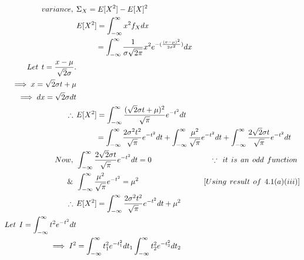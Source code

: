 \documentclass[a4paper,fleqn,11pt]{article}
\theoremstyle{mytheor}
\begin{document}
\begin{align*}
variance, \hspace{1ex} & \Sigma_{X} = E[X^2] - E[X]^2 \\
& E[X^2] = \int_{-\infty}^{\infty} x^2 f_{X} dx \\
& \hspace{6ex} = \int_{-\infty}^{\infty} \frac{1}{\sigma\sqrt{2\pi}} x^2 e^{-(\frac{(x - \mu)^2}{2\sigma^2})} dx \\
Let \hspace{1ex} t = \frac{x - \mu}{\sqrt{2} \sigma}. \\
\implies x = \sqrt{2} \sigma t + \mu \\
\implies dx = \sqrt{2} \sigma dt \\
\therefore \hspace{1ex} & E[X^2] = \int_{-\infty}^{\infty} \frac{(\sqrt{2}\sigma t + \mu)^2}{\sqrt{\pi}} e^{-t^2} dt \\
& \hspace{6ex} = \int_{-\infty}^{\infty} \frac{2\sigma^2 t^2}{\sqrt{\pi}} e^{-t^2} dt +  \int_{-\infty}^{\infty} \frac{\mu^2}{\sqrt{\pi}} e^{-t^2} dt + \int_{-\infty}^{\infty} \frac{2\sqrt{2}\sigma t}{\sqrt{\pi}} e^{-t^2} dt \\
Now, \hspace{1ex} & \int_{-\infty}^{\infty} \frac{2\sqrt{2}\sigma t}{\sqrt{\pi}} e^{-t^2} dt = 0 \hspace{18ex} \because  \hspace{1ex} it \hspace{1ex} is \hspace{1ex} an \hspace{1ex} odd \hspace{1ex} function \\
\& \hspace{1ex} & \int_{-\infty}^{\infty} \frac{\mu^2}{\sqrt{\pi}} e^{-t^2} = \mu^2 \hspace{20ex} [Using \hspace{1ex} result \hspace{1ex} of \hspace{1ex} 4.1(a)(iii)] \\
\therefore \hspace{1ex} & E[X^2] = \int_{-\infty}^{\infty} \frac{2\sigma^2 t^2}{\sqrt{\pi}} e^{-t^2} dt +  \mu^2 \\
Let \hspace{1ex} I = \int_{-\infty}^{\infty} t^2 e^{-t^2} dt \\
\implies I^2 & = \int_{-\infty}^{\infty} t_{1}^2 e^{-t_{1}^2} dt_{1} \int_{-\infty}^{\infty} t_{2}^2 e^{-t_{2}^2} dt_{2} \\

\end{align*}
\end{document}
